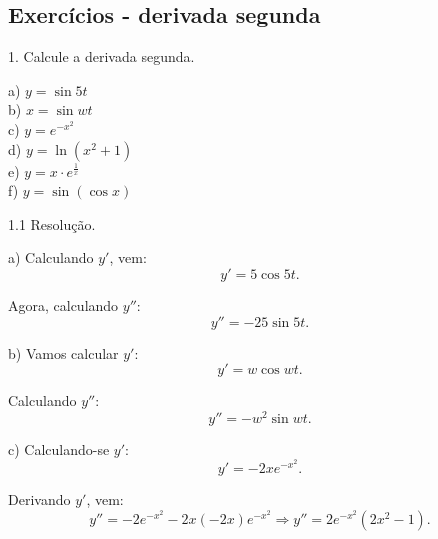 \documentclass{article}
\begin{document}
{\begin{newpage}
\subsection{Exercícios - derivada segunda}
\par
\vspace{0.3cm}
\begin{flushleft}
1. Calcule a derivada segunda.
\end{flushleft}
\par
\begin{multicols}{2}
\hspace{-15pt}a) $y=\sin{5t}$ \\
b) $x=\sin{wt}$ \\
c) $y=e^{-x^2}$ \\
d) $y=\ln{(x^2 + 1)}$ \\
e) $\displaystyle{y=x\cdot e^{\frac{1}{x}}}$ \\
f) $y=\sin{(\cos{x})}$
\end{multicols}
\par
\vspace{0.3cm}
\begin{flushleft}
1.1 Resolução.
\end{flushleft}
\par
a) Calculando $y'$, vem:
\begin{equation*} y'=5\cos{5t} .\end{equation*}
\par Agora, calculando $y''$:
\begin{equation*} y''=-25\sin{5t} .\end{equation*}
\par
\vspace{0.3cm}
b) Vamos calcular $y'$:
\begin{equation*} y'=w\cos{wt} .\end{equation*}
\par Calculando $y''$:
\begin{equation*} y''=-w^{2}\sin{wt} .\end{equation*}
\par
\vspace{0.3cm}
c) Calculando-se $y'$:
\begin{equation*} y'=-2xe^{-x^2} .\end{equation*}
\par Derivando $y'$, vem:
\begin{equation*} y''=-2e^{-x^2} -2x(-2x)e^{-x^2} \Rightarrow y''=2e^{-x^2}(2x^2 - 1) .\end{equation*}
\par

\end{newpage}}
\end{document}
